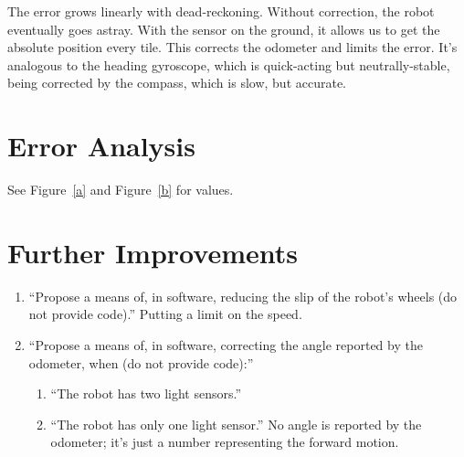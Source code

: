 \documentclass[twocolumn]{article}
\begin{document}
The error grows linearly with dead-reckoning. Without correction, the robot eventually goes astray. With the sensor on the ground, it allows us to get the absolute position every tile. This corrects the odometer and limits the error. It's analogous to the heading gyroscope, which is quick-acting but neutrally-stable, being corrected by the compass, which is slow, but accurate.

\section{Error Analysis}

See Figure~\ref{a} and Figure~\ref{b} for values.

\section{Further Improvements}

\begin{enumerate}
\item ``Propose a means of, in software, reducing the slip of the robot's wheels (do not provide code).\cite{lab2}'' Putting a limit on the speed.
\item ``Propose a means of, in software, correcting the angle reported by the odometer, when (do not provide code):\cite{lab2}''
\begin{enumerate}
\item ``The robot has two light sensors.\cite{lab2}''
\item ``The robot has only one light sensor.\cite{lab2}''
No angle is reported by the odometer; it's just a number representing the forward motion\cite{simpson1989oxford}.
\end{enumerate}
\end{enumerate}


\end{document}
